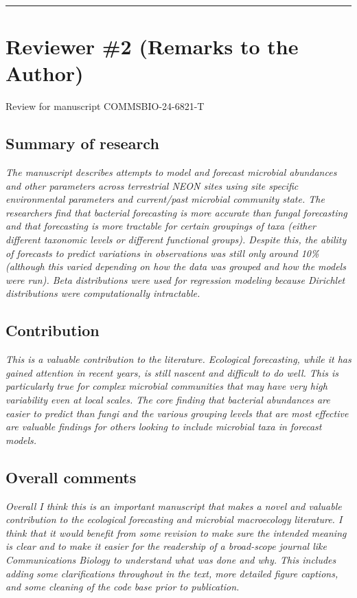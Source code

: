 \documentclass[11pt]{article}
\begin{document}
\bigskip\hrule\bigskip

\section*{Reviewer \#2 (Remarks to the Author)}

Review for manuscript COMMSBIO-24-6821-T

\subsection*{Summary of research}

\textit{The manuscript describes attempts to model and forecast microbial abundances and other parameters across terrestrial NEON sites using site specific environmental parameters and current/past microbial community state. The researchers find that bacterial forecasting is more accurate than fungal forecasting and that forecasting is more tractable for certain groupings of taxa (either different taxonomic levels or different functional groups). Despite this, the ability of forecasts to predict variations in observations was still only around 10\% (although this varied depending on how the data was grouped and how the models were run). Beta distributions were used for regression modeling because Dirichlet distributions were computationally intractable.}

\subsection*{Contribution}

\textit{This is a valuable contribution to the literature. Ecological forecasting, while it has gained attention in recent years, is still nascent and difficult to do well. This is particularly true for complex microbial communities that may have very high variability even at local scales. The core finding that bacterial abundances are easier to predict than fungi and the various grouping levels that are most effective are valuable findings for others looking to include microbial taxa in forecast models.}

\subsection*{Overall comments}

\textit{Overall I think this is an important manuscript that makes a novel and valuable contribution to the ecological forecasting and microbial macroecology literature. I think that it would benefit from some revision to make sure the intended meaning is clear and to make it easier for the readership of a broad-scope journal like Communications Biology to understand what was done and why. This includes adding some clarifications throughout in the text, more detailed figure captions, and some cleaning of the code base prior to publication.}
\end{document}
